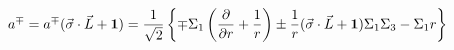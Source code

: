 \begin{equation}
\label{2-8}
a^{\mp} = a^{\mp}(\vec \sigma \cdot \vec L + {\bf 1}) =
\frac{1}{\sqrt {2}} \left\{\mp \Sigma_1 \left(\frac{\partial}{\partial r} +
\frac{1}{r}\right) \pm  \frac{1}{r}(\vec \sigma \cdot \vec L + {\bf 1})
\Sigma_1 \Sigma_3 - \Sigma_1 r \right\}
\end{equation}

